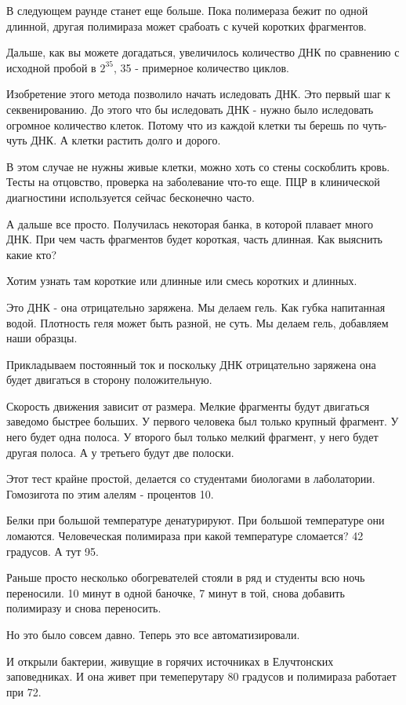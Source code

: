 \begin{description}
В следующем раунде станет еще больше. Пока полимераза бежит по одной длинной, 
другая полимираза может срабоать с кучей коротких фрагментов. 

Дальше, как вы можете догадаться, увеличилось количество ДНК по 
сравнению с исходной пробой в $2^{35}$, 35 - примерное количество циклов. 

Изобретение этого метода позволило начать иследовать ДНК. Это 
первый шаг к секвенированию. До этого что бы 
иследовать ДНК - нужно было иследовать 
огромное количество клеток. Потому что из 
каждой клетки ты берешь по чуть-чуть ДНК. 
А клетки растить долго и дорого. 

В этом случае не нужны живые клетки, можно хоть 
со стены соскоблить кровь. Тесты на отцовство, проверка на 
заболевание что-то еще. ПЦР в клинической диагностини 
используется сейчас бесконечно часто. 

А дальше все просто. Получилась некоторая банка, в
которой плавает много ДНК. При чем часть фрагментов будет 
короткая, часть длинная. Как выяснить какие кто?

Хотим узнать там короткие или длинные или смесь коротких 
и длинных. 

Это ДНК - она отрицательно заряжена. Мы делаем гель. Как губка 
напитанная водой. Плотность геля может быть разной, не суть. 
Мы делаем гель, добавляем наши образцы. 

Прикладываем постоянный ток и поскольку ДНК
отрицательно заряжена она будет двигаться в сторону положительную. 

Скорость движения зависит от размера. Мелкие фрагменты будут двигаться 
заведомо быстрее больших. У первого человека был только крупный фрагмент. 
У него будет одна полоса. У второго был только мелкий фрагмент, 
у него будет другая полоса. А у третьего будут две полоски. 

Этот тест крайне простой, делается со студентами биологами в лаболатории. 
Гомозигота по этим алелям - процентов 10. 

Белки при большой температуре  денатурируют. При большой температуре они ломаются. 
Человеческая полимираза при какой температуре сломается? 42 градусов. А тут 
95. 

Раньше просто несколько обогревателей стояли в ряд и студенты всю ночь переносили. 
10 минут в одной баночке, 7 минут в той, снова добавить полимиразу и снова переносить. 

Но это было совсем давно. Теперь это все автоматизировали. 

И открыли бактерии, живущие в горячих источниках в 
Елучтонских заповедниках. И она живет при темеперутару 80 градусов и 
полимираза работает при 72. 


\end{description}
